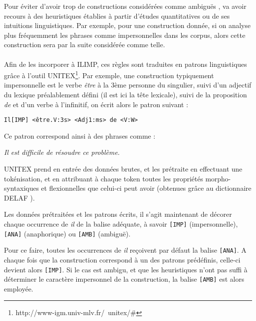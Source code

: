 \documentclass[a4paper,12pt]{article}
\begin{document}
Pour éviter d'avoir trop de constructions considérées comme \og ambiguës \fg{}, \citeauthor{danlos-ilimp-taln2005} va avoir recours à des heuristiques établies à partir d'études quantitatives ou de ses intuitions linguistiques. Par exemple, pour une construction donnée, si on analyse plus fréquemment les phrases comme impersonnelles dans les corpus, alors cette construction sera par la suite considérée comme telle.

\paragraph*{}
Afin de les incorporer à ILIMP, ces règles sont traduites en patrons linguistiques grâce à l'outil UNITEX\footnote{http://www-igm.univ-mlv.fr/~unitex/\#}. Par exemple, une construction typiquement impersonnelle est le verbe \og \textit{être} \fg{} à la 3ème personne du singulier, suivi d'un adjectif du lexique préalablement défini (il est ici la tête lexicale), suivi de la proposition \og \textit{de} \fg{} et d'un verbe à l'infinitif, on écrit alors le patron suivant :

\verb!Il[IMP] <être.V:3s> <Adj1:ms> de <V:W>!

Ce patron correspond ainsi à des phrases comme :

\og{}\textit{Il est difficile de résoudre ce problème.}\fg{}

UNITEX prend en entrée des données brutes, et les prétraite en effectuant une tokénisation, et en attribuant à chaque token toutes les propriétés morpho-syntaxiques et flexionnelles que celui-ci peut avoir (obtenues grâce au dictionnaire DELAF \citet{courtois}).

Les données prétraitées et les patrons écrits, il s'agit maintenant de décorer chaque occurrence de \og \textit{il} \fg{} de la balise adéquate, à savoir \verb![IMP]! (impersonnelle),  \verb![ANA]! (anaphorique) ou \verb![AMB]! (ambiguë).

Pour ce faire, toutes les occurrences de \og \textit{il} \fg{} reçoivent par défaut la balise \verb![ANA]!. A chaque fois que la construction correspond à un des patrons prédéfinis, celle-ci devient alors \verb![IMP]!. Si le cas est ambigu, et que les heuristiques n'ont pas suffi à déterminer le caractère impersonnel de la construction, la balise \verb![AMB]! est alors employée.
\end{document}
